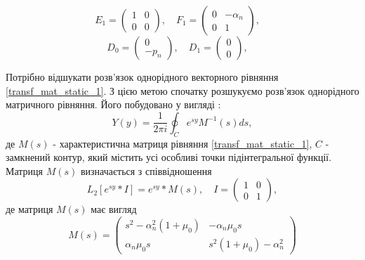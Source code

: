 \begin{equation*}
    E_1 = \begin{pmatrix}
        1 & 0 \\
        0 & 0
    \end{pmatrix}, \quad
    F_1 = \begin{pmatrix}
        0 & -\alpha_n \\
        0 & 1
    \end{pmatrix}, \quad
\end{equation*}
\begin{equation*}
    D_0 = \begin{pmatrix}
        0 \\
        -p_n
    \end{pmatrix}, \quad
    D_1 = \begin{pmatrix}
        0 \\
        0
    \end{pmatrix}, \quad
\end{equation*}

Потрібно відшукати розв'язок однорідного векторного рівняння \eqref{transf_mat_static_1}.
З цією метою спочатку розшукуємо розв'язок однорідного матричного рівняння.
Його побудовано у вигляді \cite{gantmaher}:
\begin{equation}
    Y(y) = \frac{1}{2\pi i} \oint_C e^{sy} M^{-1}(s)ds,
\end{equation}
де $M(s)$ - характеристична матриця рівняння \eqref{transf_mat_static_1}, $C$ - замкнений контур, який містить усі особливі точки підінтегральної функції.
Матриця $M(s)$ визначається з співвідношення
\begin{equation}
    L_2\left[ e^{sy}*I \right] = e^{sy} * M(s), \quad I = \begin{pmatrix} 1 & 0 \\ 0 & 1 \end{pmatrix},
\end{equation}
де матриця $M(s)$ має вигляд
\begin{equation}
    M(s) = \begin{pmatrix}
        s^2 -\alpha_n^2(1 + \mu_0) & -\alpha_n \mu_0 s \\
        \alpha_n \mu_0 s & s^2 (1 + \mu_0) -\alpha_n^2
     \end{pmatrix}
\end{equation}

